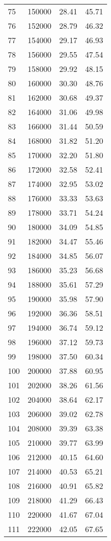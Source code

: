 \documentclass{article}
\begin{document}
\begin{longtable}{@{}l l l l}
75 & 150000 & 28.41 & 45.71\\
76 & 152000 & 28.79 & 46.32\\
77 & 154000 & 29.17 & 46.93\\
78 & 156000 & 29.55 & 47.54\\
79 & 158000 & 29.92 & 48.15\\
80 & 160000 & 30.30 & 48.76\\
81 & 162000 & 30.68 & 49.37\\
82 & 164000 & 31.06 & 49.98\\
83 & 166000 & 31.44 & 50.59\\
84 & 168000 & 31.82 & 51.20\\
85 & 170000 & 32.20 & 51.80\\
86 & 172000 & 32.58 & 52.41\\
87 & 174000 & 32.95 & 53.02\\
88 & 176000 & 33.33 & 53.63\\
89 & 178000 & 33.71 & 54.24\\
90 & 180000 & 34.09 & 54.85\\
91 & 182000 & 34.47 & 55.46\\
92 & 184000 & 34.85 & 56.07\\
93 & 186000 & 35.23 & 56.68\\
94 & 188000 & 35.61 & 57.29\\
95 & 190000 & 35.98 & 57.90\\
96 & 192000 & 36.36 & 58.51\\
97 & 194000 & 36.74 & 59.12\\
98 & 196000 & 37.12 & 59.73\\
99 & 198000 & 37.50 & 60.34\\
100 & 200000 & 37.88 & 60.95\\
101 & 202000 & 38.26 & 61.56\\
102 & 204000 & 38.64 & 62.17\\
103 & 206000 & 39.02 & 62.78\\
104 & 208000 & 39.39 & 63.38\\
105 & 210000 & 39.77 & 63.99\\
106 & 212000 & 40.15 & 64.60\\
107 & 214000 & 40.53 & 65.21\\
108 & 216000 & 40.91 & 65.82\\
109 & 218000 & 41.29 & 66.43\\
110 & 220000 & 41.67 & 67.04\\
111 & 222000 & 42.05 & 67.65\\

\end{longtable}
\end{document}

